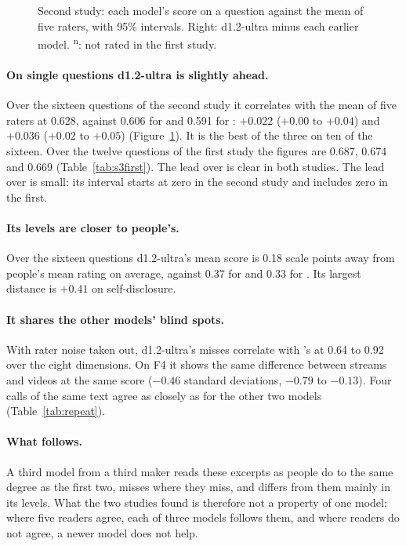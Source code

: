 \begin{figure}[!htb]\centering

\caption{Second study: each model's score on a question against the mean of five raters, with 95\% intervals.
Right: d1.2-ultra minus each earlier model. \textsuperscript{n}: not rated in the first
study.}\label{fig:s3questions}
\end{figure}

\paragraph{On single questions d1.2-ultra is slightly ahead.} Over the sixteen questions of the second study it
correlates with the mean of five raters at 0.628, against 0.606 for \jev{} and 0.591 for \drex{}: $+0.022$
($+0.00$ to $+0.04$) and $+0.036$ ($+0.02$ to $+0.05$) (Figure~\ref{fig:s3questions}). It is the best of the
three on ten of the sixteen. Over the twelve questions of the first study the figures are 0.687, 0.674 and
0.669 (Table~\ref{tab:s3first}). The lead over \drex{} is clear in both studies. The lead over \jev{} is small:
its interval starts at zero in the second study and includes zero in the first.

\paragraph{Its levels are closer to people's.} Over the sixteen questions d1.2-ultra's mean score is 0.18 scale
points away from people's mean rating on average, against 0.37 for \jev{} and 0.33 for \drex{}. Its largest
distance is $+0.41$ on self-disclosure.

\paragraph{It shares the other models' blind spots.} With rater noise taken out, d1.2-ultra's misses correlate
with \jev{}'s at 0.64 to 0.92 over the eight dimensions. On F4 it shows the same difference between streams and
videos at the same score ($-0.46$ standard deviations, $-0.79$ to $-0.13$). Four calls of the same text agree as
closely as for the other two models (Table~\ref{tab:repeat}).

\paragraph{What follows.} A third model from a third maker reads these excerpts as people do to the same degree
as the first two, misses where they miss, and differs from them mainly in its levels. What the two studies found
is therefore not a property of one model: where five readers agree, each of three models follows them, and
where readers do not agree, a newer model does not help.
